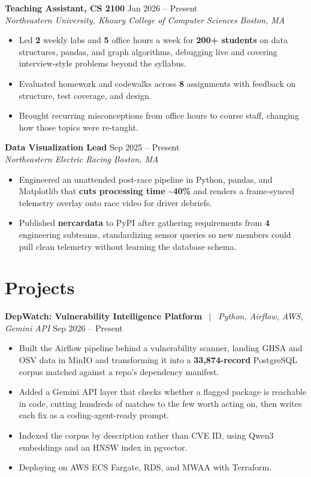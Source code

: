 \documentclass[letterpaper,10pt]{article}
\newcommand{\entrysize}{\fontsize{10.5}{12}\selectfont}
\newif\ifentrygap
\newcommand{\entrygapsize}{6pt}
\newcommand{\entryfirstgap}{0.4pt}
\newcommand{\entrysep}{\ifentrygap\vspace{\entrygapsize}\else\vspace{\entryfirstgap}\fi\global\entrygaptrue}
\let\entryorigsection\section
\renewcommand{\section}{\global\entrygapfalse\entryorigsection}
\newcommand{\entry}[4]{\entrysep{\entrysize\textbf{#1}} \hfill #2 \\ \textit{#3} \hfill \textit{#4}}
\newcommand{\project}[3]{\entrysep{\entrysize\textbf{#1}} \ $\vert$ \ \textit{#2} \hfill #3}
\begin{document}
\entry{Teaching Assistant, CS 2100}{Jan 2026 -- Present}
      {Northeastern University, Khoury College of Computer Sciences}{Boston, MA}
\begin{itemize}
  \item Led \textbf{2} weekly labs and \textbf{5} office hours a week for \textbf{200+ students} on data structures, pandas, and graph
        algorithms, debugging live and covering interview-style problems beyond the syllabus.
  \item Evaluated homework and codewalks across \textbf{8} assignments with feedback on structure, test coverage, and design.
  \item Brought recurring misconceptions from office hours to course staff, changing how those topics were re-taught.
\end{itemize}

\entry{Data Visualization Lead}{Sep 2025 -- Present}
      {Northeastern Electric Racing}{Boston, MA}
\begin{itemize}
  \item Engineered an unattended post-race pipeline in Python, pandas, and Matplotlib that \textbf{cuts processing time
        \textasciitilde40\%} and renders a frame-synced telemetry overlay onto race video for driver debriefs.
  \item Published \textbf{nercardata} to PyPI after gathering requirements from \textbf{4} engineering subteams,
        standardizing sensor queries so new members could pull clean telemetry without learning the database schema.
\end{itemize}

\section{Projects}

\project{DepWatch: Vulnerability Intelligence Platform}{Python, Airflow, AWS, Gemini API}{Sep 2026 -- Present}
\begin{itemize}
  \item Built the Airflow pipeline behind a vulnerability scanner, landing GHSA and OSV data in MinIO and
        transforming it into a \textbf{33,874-record} PostgreSQL corpus matched against a repo's dependency manifest.
  \item Added a Gemini API layer that checks whether a flagged package is reachable in code, cutting hundreds of
        matches to the few worth acting on, then writes each fix as a coding-agent-ready prompt.
  \item Indexed the corpus by description rather than CVE ID, using Qwen3 embeddings and an HNSW index in pgvector.
  \item Deploying on AWS ECS Fargate, RDS, and MWAA with Terraform.
\end{itemize}
\end{document}
